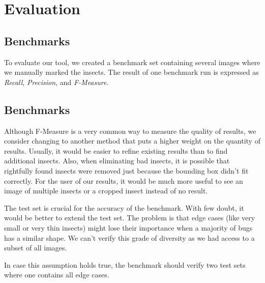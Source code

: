 %
\section{Evaluation}
\label{sec_eval}

\subsection{Benchmarks}
To evaluate our tool, we created a benchmark set containing several images where we manually marked the insects.
The result of one benchmark run is expressed as \textit{Recall}, \textit{Precision}, and \textit{F-Measure}.

\subsection{Benchmarks}
Although F-Measure is a very common way to measure the quality of results, we consider changing  to another method that puts a higher weight on the quantity of results.
Usually, it would be easier to refine existing results than to find additional insects. 
Also, when eliminating bad insects, it is possible that rightfully found insects were removed just because the bounding box didn't fit correctly.
For the user of our results, it would be much more useful to see an image of multiple insects or a cropped insect instead of no result.

The test set is crucial for the accuracy of the benchmark. 
With few doubt, it would be better to extend the test set. 
The problem is that edge cases (like very small or very thin insects) might lose their importance when a majority of bugs has a similar shape.
We can't verify this grade of diversity as we had access to a subset of all images.

In case this assumption holds true, the benchmark should verify two test sets where one contains all edge cases.
